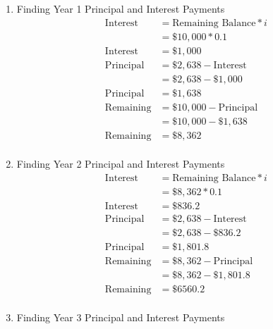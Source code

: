 \documentclass{report} %
\begin{document}
\begin{enumerate}
    \item Finding Year 1 Principal and Interest Payments
    \begin{equation*}
        \begin{aligned}
            \text{Interest} &= \text{Remaining Balance} * i \\
                            &= \$10,000 * 0.1 \\
            \text{Interest} &= \$1,000 \\
            \text{Principal} &= \$2,638 - \text{Interest} \\
                             &= \$2,638 - \$1,000 \\
            \text{Principal} &= \$1,638 \\  
            \text{Remaining} &= \$10,000 - \text{Principal} \\
                             &= \$10,000 - \$1,638 \\
            \text{Remaining} &= \$8,362 \\
        \end{aligned}
    \end{equation*} 
    \item Finding Year 2 Principal and Interest Payments
    \begin{equation*}
        \begin{aligned}
            \text{Interest} &= \text{Remaining Balance} * i \\
                            &= \$8,362 * 0.1 \\
            \text{Interest} &= \$836.2 \\
            \text{Principal} &= \$2,638 - \text{Interest} \\
                             &= \$2,638 - \$836.2 \\
            \text{Principal} &= \$1,801.8 \\
            \text{Remaining} &= \$8,362 - \text{Principal} \\
                             &= \$8,362 - \$1,801.8 \\
            \text{Remaining} &= \$6560.2 \\
        \end{aligned}
    \end{equation*} 
    \item Finding Year 3 Principal and Interest Payments
    \begin{equation*}
        \begin{aligned}

\end{aligned}
\end{equation*}
\end{enumerate}
\end{document}
